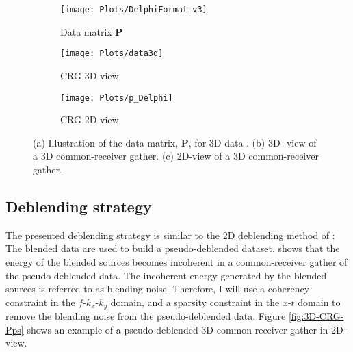 \documentclass{madrid15WS}
\begin{document}
\begin{figure}[h!]
	
	\centering
	\begin{subfigure}[t]{0.4\textwidth}
		\centering
		\texttt{[image: Plots/DelphiFormat-v3]}
		\caption{Data matrix $\mathbf{P}$}
		\label{fig:DelphiFormat}
	\end{subfigure}
	\qquad  
	\centering
	\begin{subfigure}[t]{0.3\textwidth}
		\centering
		\texttt{[image: Plots/data3d]}
		\caption{CRG 3D-view}
		\label{fig:CRG_3D-view}
	\end{subfigure}
	
	\centering
	\begin{subfigure}[t]{0.8\textwidth}
		\centering
		\texttt{[image: Plots/p\_Delphi]}
		\caption{CRG 2D-view}
		\label{fig:CRG_2D-view}
	\end{subfigure}
	
	\caption{(a) Illustration of the data matrix, $\mathbf{P}$, for 3D data \citep{Delphi-Format}. (b) 3D- view of a 3D common-receiver gather. (c) 2D-view of a 3D common-receiver gather.}
	\label{fig:DataSorting}
\end{figure}


\subsection{Deblending strategy}

The presented deblending strategy is similar to the 2D deblending method of \citet{Mahdad-Deblending-Method}: The blended data are used to build a pseudo-deblended dataset. \citet{Mahdad-Deblending-Method} shows that the energy of the blended sources becomes incoherent in a common-receiver gather of the pseudo-deblended data. The incoherent energy generated by the blended sources is referred to as blending noise. Therefore, I will use a coherency constraint in the $f$-$k_x$-$k_y$ domain, and a sparsity constraint in the $x$-$t$ domain to remove the blending noise from the pseudo-deblended data. Figure \ref{fig:3D-CRG-Pps} shows an example of a pseudo-deblended 3D common-receiver gather in 2D-view. 
\end{document}
